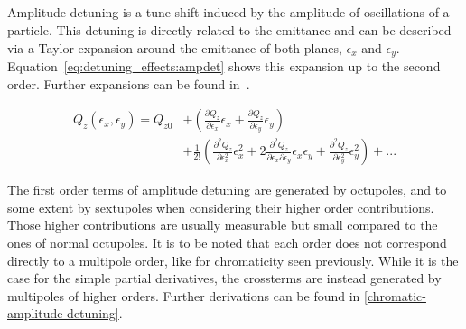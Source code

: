 \subsection{}

Amplitude detuning is a tune shift induced by the amplitude of oscillations of a particle. This
detuning is directly related to the emittance and can be described via a Taylor expansion around the
emittance of both planes, $\epsilon_x$ and $\epsilon_y$.
Equation~\eqref{eq:detuning_effects:ampdet} shows this expansion up to the second order. 
Further expansions can be found in~\cite{dilly_derivation_2023}.

\begin{equation}
\begin{aligned}
Q_z(\epsilon_x, \epsilon_y) = Q_{z0} &+ \left(\frac{\partial Q_z}{\partial \epsilon_x} \epsilon_x
                                                + \frac{\partial Q_z}{\partial \epsilon_y} \epsilon_y
                                                \right) \\
                                     &+ \frac{1}{2!} \left(\frac{\partial^2Q_z}{\partial \epsilon_x^2}\epsilon_x^2 
                                                          + 2 \frac{\partial^2Q_z}{\partial \epsilon_x \partial \epsilon_y}\epsilon_x \epsilon_y
                                                          + \frac{\partial^2Q_z}{\partial \epsilon_y^2}\epsilon_y^2\right)
                                     + ... 
\end{aligned}
\label{eq:detuning_effects:ampdet}
\end{equation}

The first order terms of amplitude detuning are generated by octupoles, and to some extent by
sextupoles when considering their higher order contributions. Those higher contributions are usually
measurable but small compared to the ones of normal octupoles.  
It is to be noted that each order does not correspond directly to a multipole order, like for
chromaticity seen previously.  While it is the case for the simple partial derivatives, the
crossterms are instead generated by multipoles of higher orders.
Further derivations can be found in \cref{chromatic-amplitude-detuning}.



